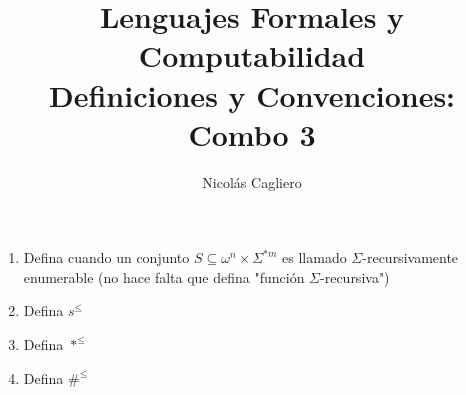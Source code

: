 \documentclass{article}
\title{Lenguajes Formales y Computabilidad \\
        \large Definiciones y Convenciones: Combo 3 }
\author{Nicolás Cagliero}
\begin{document}
\maketitle

\begin{enumerate}
    \item Defina cuando un conjunto $S \subseteq \omega^n \times \Sigma^{*m}$ 
    es llamado $\Sigma$-recursivamente enumerable (no hace falta que defina "función $\Sigma$-recursiva")

    \item Defina $s^{\leq}$
    
    \item Defina $*^{\leq}$
    
    \item Defina $\#^{\leq}$
\end{enumerate}
\end{document}
